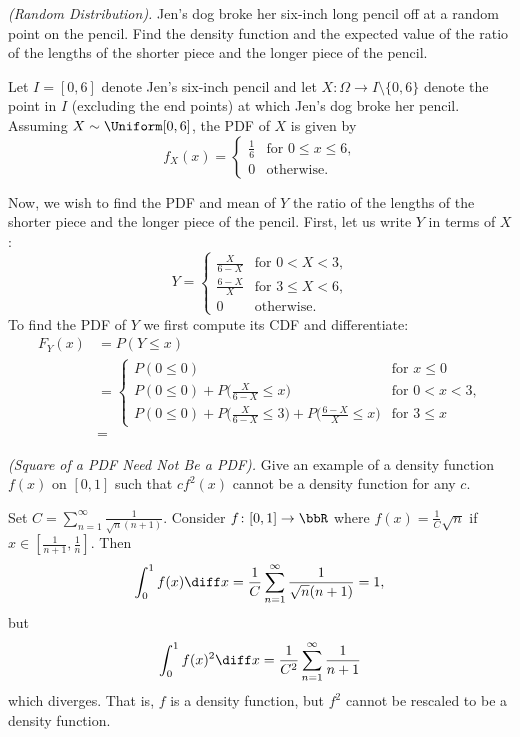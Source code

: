 \begin{problem}[Handout 12, \# 19]
  \emph{(Random Distribution).} Jen's dog broke her six-inch long pencil
  off at a random point on the pencil. Find the density function and the
  expected value of the ratio of the lengths of the shorter piece and the
  longer piece of the pencil.
\end{problem}
\begin{solution}
  Let \(I=[0,6]\) denote Jen's six-inch pencil and let
  \(X\colon\Omega\to I\setminus\{0,6\}\) denote the point in \(I\)
  (excluding the end points) at which Jen's dog broke her pencil. Assuming
  \(X\sim\Uniform[0,6]\), the PDF of \(X\) is given by
  \[
    f_X(x)=
    \begin{cases}
      \frac{1}{6}&\text{for \(0\leq x\leq 6\),}\\
      0&\text{otherwise.}
    \end{cases}
  \]

  Now, we wish to find the PDF and mean of \(Y\) the ratio of the lengths
  of the shorter piece and the longer piece of the pencil. First, let us
  write \(Y\) in terms of \(X\):
  \[
    Y=
    \begin{cases}
      \frac{X}{6-X}&\text{for \(0<X<3\),}\\
      \frac{6-X}{X}&\text{for \(3\leq X<6\),}\\
      0&\text{otherwise.}
    \end{cases}
  \]
  To find the PDF of \(Y\) we first compute its CDF and differentiate:
  \begin{align*}
    F_Y(x)
    &=P(Y\leq x)\\
    &=\begin{cases}
      P(0\leq 0)&\text{for \(x\leq 0\)}\\
      P(0\leq 0)+P\bigl(\frac{X}{6-X}\leq x\bigr)&\text{for \(0<x<3\),}\\
      P(0\leq 0)+P\bigl(\frac{X}{6-X}\leq 3\bigr)+
      P\bigl(\frac{6-X}{X}\leq x\bigr)&\text{for \(3\leq x\)}
    \end{cases}\\
    &=
  \end{align*}
\end{solution}
\newpage

\begin{problem}[Handout 12, \# 20]
  \emph{(Square of a PDF Need Not Be a PDF).} Give an example of a density
  function \(f(x)\) on \([0,1]\) such that \(cf^2(x)\) cannot be a density
  function for any \(c\).
\end{problem}
\begin{solution}
  Set $C = \sum_{n=1}^\infty \frac{1}{\sqrt{n}(n+1)}$. Consider
  $f\colon [0,1] \to \bbR$ where $f(x) = \frac{1}{C} \sqrt{n}$ if
  $x \in [\frac{1}{n+1},\frac{1}{n}]$. Then
  \[
    \int_0^1 f(x) \diff x = \frac{1}{C} \sum_{n=1}^\infty
    \frac{1}{\sqrt{n}(n+1)} =1,
  \]
  but
  \[
    \int_0^1 f(x)^2 \diff x = \frac{1}{C^2} \sum_{n=1}^\infty \frac{1}{n+1}
  \]
  which diverges. That is, $f$ is a density function, but $f^2$ cannot be
  rescaled to be a density function.
\end{solution}
\newpage

